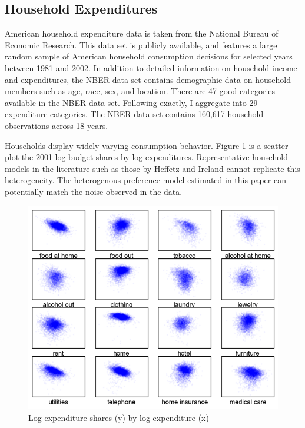 \subsection{Household Expenditures}
American household expenditure data is taken from the National Bureau of Economic Research.\citep{NBERCEX2011}  This data set is publicly available, and features a large random sample of American household consumption decisions for selected years between 1981 and 2002.  In addition to detailed information on household income and expenditures, the NBER data set contains demographic data on household members such as age, race, sex, and location.
There are 47 good categories available in the NBER data set.
Following \citet{Heffetz2011} exactly,\footnotemark{} I aggregate into 29 expenditure categories.
The NBER data set contains 160,617 household observations across 18 years.

Households display widely varying consumption behavior.  Figure \ref{fig:exp_shr} is a scatter plot the 2001 log budget shares by log expenditures.  Representative household models in the literature such as those by Heffetz and Ireland cannot replicate this heterogeneity.\footnotemark{} The heterogenous preference model estimated in this paper can potentially match the noise observed in the data.

\begin{figure}
	\centering
		\includegraphics[scale=1]{pics/shr_plot.png}
	\caption{Log expenditure shares (y) by log expenditure (x)}
	\label{fig:exp_shr}
\end{figure}

